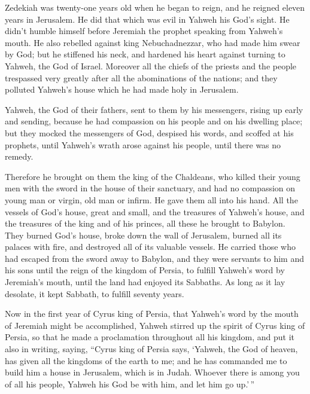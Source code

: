  Zedekiah was twenty-one years old when he began to reign,
and he reigned eleven years in Jerusalem.  He did that
which was evil in Yahweh his God's sight. He didn't humble himself
before Jeremiah the prophet speaking from Yahweh's mouth. 
He also rebelled against king Nebuchadnezzar, who had made him swear by
God; but he stiffened his neck, and hardened his heart against turning
to Yahweh, the God of Israel.  Moreover all the chiefs of
the priests and the people trespassed very greatly after all the
abominations of the nations; and they polluted Yahweh's house which he
had made holy in Jerusalem.

 Yahweh, the God of their fathers, sent to them by his
messengers, rising up early and sending, because he had compassion on
his people and on his dwelling place;  but they mocked the
messengers of God, despised his words, and scoffed at his prophets,
until Yahweh's wrath arose against his people, until there was no
remedy.

 Therefore he brought on them the king of the Chaldeans,
who killed their young men with the sword in the house of their
sanctuary, and had no compassion on young man or virgin, old man or
infirm. He gave them all into his hand.  All the vessels of
God's house, great and small, and the treasures of Yahweh's house, and
the treasures of the king and of his princes, all these he brought to
Babylon.  They burned God's house, broke down the wall of
Jerusalem, burned all its palaces with fire, and destroyed all of its
valuable vessels.  He carried those who had escaped from
the sword away to Babylon, and they were servants to him and his sons
until the reign of the kingdom of Persia,  to fulfill
Yahweh's word by Jeremiah's mouth, until the land had enjoyed its
Sabbaths. As long as it lay desolate, it kept Sabbath, to fulfill
seventy years.

 Now in the first year of Cyrus king of Persia, that
Yahweh's word by the mouth of Jeremiah might be accomplished, Yahweh
stirred up the spirit of Cyrus king of Persia, so that he made a
proclamation throughout all his kingdom, and put it also in writing,
saying,  ``Cyrus king of Persia says, `Yahweh, the God of
heaven, has given all the kingdoms of the earth to me; and he has
commanded me to build him a house in Jerusalem, which is in Judah.
Whoever there is among you of all his people, Yahweh his God be with
him, and let him go up.'\,''
